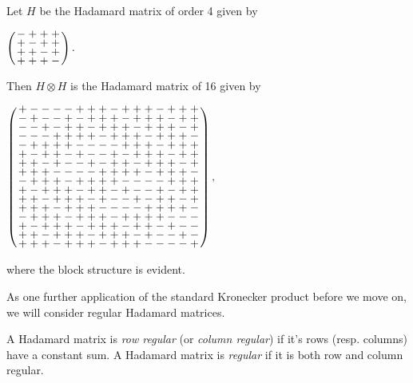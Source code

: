 \documentclass[../../../main]{subfiles}
\begin{document}
 \begin{ex}\label{regular-ex}
  Let $H$ be the Hadamard matrix of order 4 given by
  \begin{defenum}
   \item $
   \arraycolsep=1.25pt\def\arraystretch{0.625}
   \left(\begin{array}{cccc}
    -&+&+&+\\
    +&-&+&+\\
    +&+&-&+\\
    +&+&+&-
   \end{array}\right).
   $
  \end{defenum}
  Then $H \otimes H$ is the Hadamard matrix of 16 given by
  \begin{defenum}[resume]
   \item $
   \arraycolsep=1.25pt\def\arraystretch{0.625}
   \left(\begin{array}{cccccccccccccccc}
+&-&-&-&-&+&+&+&-&+&+&+&-&+&+&+\\
-&+&-&-&+&-&+&+&+&-&+&+&+&-&+&+\\
-&-&+&-&+&+&-&+&+&+&-&+&+&+&-&+\\
-&-&-&+&+&+&+&-&+&+&+&-&+&+&+&-\\
-&+&+&+&+&-&-&-&-&+&+&+&-&+&+&+\\
+&-&+&+&-&+&-&-&+&-&+&+&+&-&+&+\\
+&+&-&+&-&-&+&-&+&+&-&+&+&+&-&+\\
+&+&+&-&-&-&-&+&+&+&+&-&+&+&+&-\\
-&+&+&+&-&+&+&+&+&-&-&-&-&+&+&+\\
+&-&+&+&+&-&+&+&-&+&-&-&+&-&+&+\\
+&+&-&+&+&+&-&+&-&-&+&-&+&+&-&+\\
+&+&+&-&+&+&+&-&-&-&-&+&+&+&+&-\\
-&+&+&+&-&+&+&+&-&+&+&+&+&-&-&-\\
+&-&+&+&+&-&+&+&+&-&+&+&-&+&-&-\\
+&+&-&+&+&+&-&+&+&+&-&+&-&-&+&-\\
+&+&+&-&+&+&+&-&+&+&+&-&-&-&-&+
   \end{array}\right),
   $
  \end{defenum}
  where the block structure is evident.
 \end{ex}
 
 As one further application of the standard Kronecker product before we move on, we will consider regular Hadamard matrices.
 
 \begin{defin}
  A Hadamard matrix is {\it row regular} (or {\it column regular}) if it's rows (resp. columns) have a constant sum. A Hadamard matrix is {\it regular} if it is both row and column regular.
 \end{defin}
 
\end{document}
